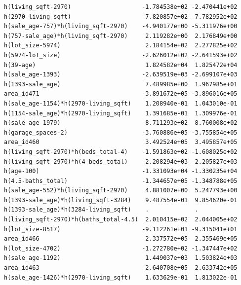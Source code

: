 \documentclass[
]{article}
\begin{document}
\begin{verbatim}
h(living_sqft-2970)                    -1.784538e+02 -2.470441e+02
h(2970-living_sqft)                    -7.820857e+02 -7.782952e+02
h(sale_age-757)*h(living_sqft-2970)    -4.940177e+00 -5.311976e+00
h(757-sale_age)*h(living_sqft-2970)     2.119282e+00  2.176849e+00
h(lot_size-5974)                        2.184154e+02  2.277825e+02
h(5974-lot_size)                       -2.626012e+02 -2.641593e+02
h(39-age)                               1.824582e+04  1.825472e+04
h(sale_age-1393)                       -2.639519e+03 -2.699107e+03
h(1393-sale_age)                        7.489985e+00  1.967985e+01
area_id471                             -3.891672e+05 -3.896016e+05
h(sale_age-1154)*h(2970-living_sqft)    1.208940e-01  1.043010e-01
h(1154-sale_age)*h(2970-living_sqft)    1.391685e-01  1.309976e-01
h(sale_age-1979)                        8.711293e+02  8.760008e+02
h(garage_spaces-2)                     -3.760886e+05 -3.755854e+05
area_id460                              3.492524e+05  3.495857e+05
h(living_sqft-2970)*h(beds_total-4)    -1.591863e+02 -1.608025e+02
h(living_sqft-2970)*h(4-beds_total)    -2.208294e+03 -2.205827e+03
h(age-100)                             -1.331093e+04 -1.330235e+04
h(4.5-baths_total)                     -1.344657e+05 -1.348788e+05
h(sale_age-552)*h(living_sqft-2970)     4.881007e+00  5.247793e+00
h(1393-sale_age)*h(living_sqft-3284)    9.487554e-01  9.854620e-01
h(1393-sale_age)*h(3284-living_sqft)    .             .           
h(living_sqft-2970)*h(baths_total-4.5)  2.010415e+02  2.044005e+02
h(lot_size-8517)                       -9.112261e+01 -9.315041e+01
area_id466                              2.337572e+05  2.355469e+05
h(lot_size-4702)                       -1.272780e+02 -1.347447e+02
h(sale_age-1192)                        1.449037e+03  1.503824e+03
area_id463                              2.640708e+05  2.633742e+05
h(sale_age-1426)*h(2970-living_sqft)    1.633629e-01  1.813022e-01
                                                                  

\end{verbatim}
\end{document}
